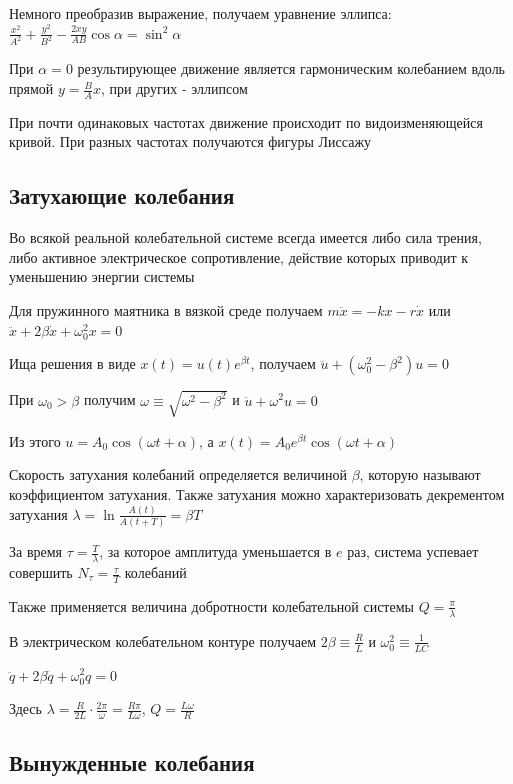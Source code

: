 \documentclass[12pt]{article}
\begin{document}
Немного преобразив выражение, получаем уравнение эллипса: $\frac{x^2}{A^2} + \frac{y^2}{B^2} - \frac{2xy}{AB} \cos \alpha = \sin^2 \alpha$

При $\alpha = 0$ результирующее движение является гармоническим колебанием вдоль прямой $y = \frac{B}{A} x$,
при других - эллипсом


При почти одинаковых частотах движение происходит по видоизменяющейся кривой. При разных частотах получаются фигуры Лиссажу

\subsection{Затухающие колебания}

Во всякой реальной колебательной системе всегда имеется либо сила трения, либо активное электрическое сопротивление,
действие которых приводит к уменьшению энергии системы 

Для пружинного маятника в вязкой среде получаем $m \ddot x = -kx - r\dot x$ или $\ddot x + 2 \beta \dot x + \omega^2_0 x = 0$

Ища решения в виде $x(t) = u(t) e^{\beta t}$, получаем $\ddot u + (\omega^2_0 - \beta^2) u = 0$

При $\omega_0 > \beta$ получим $\omega \equiv \sqrt{\omega^2 - \beta^2}$ и $\ddot u + \omega^2 u = 0$

Из этого $u = A_0 \cos (\omega t + \alpha)$, а $x(t) = A_0 e^{\beta t} \cos (\omega t + \alpha)$

Скорость затухания колебаний определяется величиной $\beta$, которую называют коэффициентом затухания. 
Также затухания можно характеризовать декрементом затухания $\lambda = \ln \frac{A(t)}{A(t + T)} = \beta T$

За время $\tau = \frac{T}{\lambda}$, за которое амплитуда уменьшается в $e$ раз, система успевает совершить $N_\tau = \frac{\tau}{T}$
колебаний

Также применяется величина добротности колебательной системы $Q = \frac{\pi}{\lambda}$

В электрическом колебательном контуре получаем $2\beta \equiv \frac{R}{L}$ и $\omega_0^2 \equiv \frac{1}{LC}$

$\ddot q + 2\beta \dot q + \omega^2_0 q = 0$

Здесь $\lambda = \frac{R}{2L} \cdot \frac{2\pi}{\omega} = \frac{R\pi}{L \omega}$, $Q = \frac{L\omega}{R}$


\subsection{Вынужденные колебания}
\end{document}
